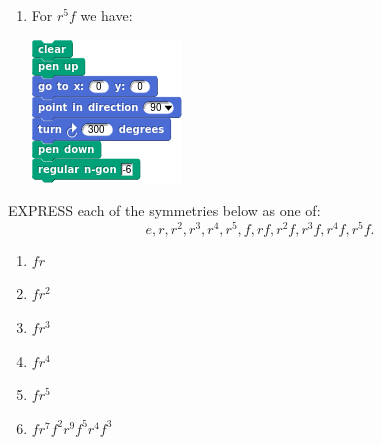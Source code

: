\documentclass[noauthor,nooutcomes,12pt,hints,handout]{ximera}
\begin{document}
\begin{question}
\begin{freeResponse}
\begin{enumerate}
\begin{center}
      \end{center}
      \item For $r^5f$ we have:
      \begin{center}
        \includegraphics[width=.3\textwidth]{r5fHexSCRIPT.png}   \qquad {}
      \end{center}
    \end{enumerate}
    \end{freeResponse}
\end{question}
\mynewpage


\begin{question}
 EXPRESS each of the symmetries below as one of:
 \[
 e,r,r^2,r^3,r^4,r^5,f,rf,r^2f,r^3f, r^4f,r^5f.
 \]

 \begin{enumerate}
 \item $fr$
 \item $fr^2$
 \item $fr^3$
 \item $fr^4$
 \item $fr^5$
 \item $fr^7f^2r^9f^5r^4f^3$
 \end{enumerate}
 \begin{freeResponse}
 \end{freeResponse}
\end{question}
\end{document}
